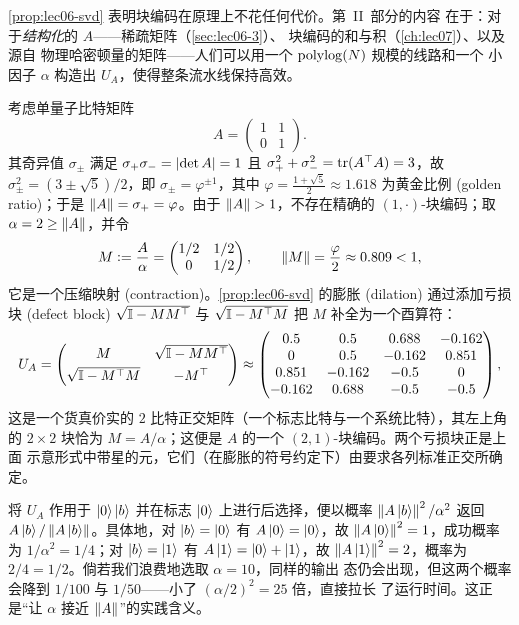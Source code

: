\cref{prop:lec06-svd} 表明块编码在原理上不花任何代价。第~II~部分的内容
在于：对于\emph{结构化}的 $A$——稀疏矩阵（\cref{sec:lec06-3}）、
块编码的和与积（\cref{ch:lec07}）、以及源自
物理哈密顿量的矩阵——人们可以用一个 $\operatorname{polylog}(N)$ 规模的线路和一个
小因子 $\alpha$ 构造出 $U_A$，使得整条流水线保持高效。

\begin{example}
\label{exa:lec06-2x2}
考虑单量子比特矩阵
\[
  A=\begin{pmatrix} 1 & 1\\ 0 & 1\end{pmatrix}.
\]
其奇异值 $\sigma_\pm$ 满足 $\sigma_+\sigma_-=\left\lvert \det A \right\rvert=1$ 且
$\sigma_+^2+\sigma_-^2=\operatorname{tr}(A^\top A)=3$，故 $\sigma_\pm^2=(3\pm\sqrt5)/2$，即
$\sigma_\pm=\varphi^{\pm1}$，其中 $\varphi=\tfrac{1+\sqrt5}{2}\approx1.618$ 为黄金比例
(golden ratio)；于是 $\left\lVert A \right\rVert=\sigma_+=\varphi$。由于 $\left\lVert A \right\rVert>1$，不存在精确的
$(1,\cdot)$-块编码；取 $\alpha=2\ge\left\lVert A \right\rVert$，并令
\[
  M\vcentcolon=\frac{A}{\alpha}=\begin{pmatrix}1/2&1/2\\0&1/2\end{pmatrix},
  \qquad \left\lVert M \right\rVert=\frac{\varphi}{2}\approx0.809<1 ,
\]
它是一个压缩映射 (contraction)。\cref{prop:lec06-svd} 的膨胀 (dilation) 通过添加亏损块
(defect block) $\sqrt{\mathbb{I}-MM^\top}$ 与 $\sqrt{\mathbb{I}-M^\top M}$ 把 $M$ 补全为一个酉算符：
\[
  U_A=\begin{pmatrix} M & \sqrt{\mathbb{I}-MM^\top}\\[3pt]
                      \sqrt{\mathbb{I}-M^\top M} & -M^\top\end{pmatrix}
     \approx\begin{pmatrix}
        0.5 & 0.5 & 0.688 & -0.162\\
        0   & 0.5 & -0.162 & 0.851\\
        0.851 & -0.162 & -0.5 & 0\\
        -0.162 & 0.688 & -0.5 & -0.5
      \end{pmatrix},
\]
这是一个货真价实的 $2$ 比特正交矩阵（一个标志比特与一个系统比特），其左上角的
$2\times2$ 块恰为 $M=A/\alpha$；这便是 $A$ 的一个 $(2,1)$-块编码。两个亏损块正是上面
示意形式中带星的元，它们（在膨胀的符号约定下）由要求各列标准正交所确定。

将 $U_A$ 作用于 $\ket{0}\ket{b}$ 并在标志 $\ket{0}$ 上进行后选择，便以概率
$\left\lVert A\ket{b} \right\rVert^2/\alpha^2$ 返回 $A\ket{b}/\left\lVert A\ket{b} \right\rVert$。具体地，对
$\ket{b}=\ket{0}$ 有 $A\ket{0}=\ket{0}$，故 $\left\lVert A\ket{0} \right\rVert^2=1$，成功概率为
$1/\alpha^2=1/4$；对 $\ket{b}=\ket{1}$ 有 $A\ket{1}=\ket{0}+\ket{1}$，故
$\left\lVert A\ket{1} \right\rVert^2=2$，概率为 $2/4=1/2$。倘若我们浪费地选取 $\alpha=10$，同样的输出
态仍会出现，但这两个概率会降到 $1/100$ 与 $1/50$——小了 $(\alpha/2)^2=25$ 倍，直接拉长
了运行时间。这正是``让 $\alpha$ 接近 $\left\lVert A \right\rVert$''的实践含义。
\end{example}
